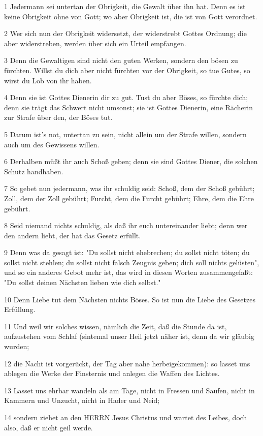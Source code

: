 \par 1 Jedermann sei untertan der Obrigkeit, die Gewalt über ihn hat. Denn es ist keine Obrigkeit ohne von Gott; wo aber Obrigkeit ist, die ist von Gott verordnet.
\par 2 Wer sich nun der Obrigkeit widersetzt, der widerstrebt Gottes Ordnung; die aber widerstreben, werden über sich ein Urteil empfangen.
\par 3 Denn die Gewaltigen sind nicht den guten Werken, sondern den bösen zu fürchten. Willst du dich aber nicht fürchten vor der Obrigkeit, so tue Gutes, so wirst du Lob von ihr haben.
\par 4 Denn sie ist Gottes Dienerin dir zu gut. Tust du aber Böses, so fürchte dich; denn sie trägt das Schwert nicht umsonst; sie ist Gottes Dienerin, eine Rächerin zur Strafe über den, der Böses tut.
\par 5 Darum ist's not, untertan zu sein, nicht allein um der Strafe willen, sondern auch um des Gewissens willen.
\par 6 Derhalben müßt ihr auch Schoß geben; denn sie sind Gottes Diener, die solchen Schutz handhaben.
\par 7 So gebet nun jedermann, was ihr schuldig seid: Schoß, dem der Schoß gebührt; Zoll, dem der Zoll gebührt; Furcht, dem die Furcht gebührt; Ehre, dem die Ehre gebührt.
\par 8 Seid niemand nichts schuldig, als daß ihr euch untereinander liebt; denn wer den andern liebt, der hat das Gesetz erfüllt.
\par 9 Denn was da gesagt ist: "Du sollst nicht ehebrechen; du sollst nicht töten; du sollst nicht stehlen; du sollst nicht falsch Zeugnis geben; dich soll nichts gelüsten", und so ein anderes Gebot mehr ist, das wird in diesen Worten zusammengefaßt: "Du sollst deinen Nächsten lieben wie dich selbst."
\par 10 Denn Liebe tut dem Nächsten nichts Böses. So ist nun die Liebe des Gesetzes Erfüllung.
\par 11 Und weil wir solches wissen, nämlich die Zeit, daß die Stunde da ist, aufzustehen vom Schlaf (sintemal unser Heil jetzt näher ist, denn da wir gläubig wurden;
\par 12 die Nacht ist vorgerückt, der Tag aber nahe herbeigekommen): so lasset uns ablegen die Werke der Finsternis und anlegen die Waffen des Lichtes.
\par 13 Lasset uns ehrbar wandeln als am Tage, nicht in Fressen und Saufen, nicht in Kammern und Unzucht, nicht in Hader und Neid;
\par 14 sondern ziehet an den HERRN Jesus Christus und wartet des Leibes, doch also, daß er nicht geil werde.

